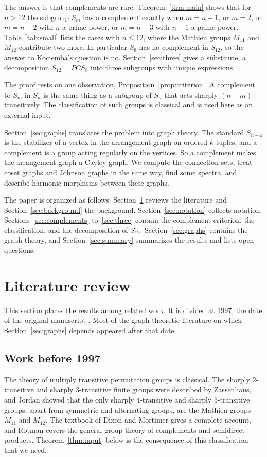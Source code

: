 \documentclass[12pt,letterpaper]{article}
\numberwithin{equation}{section}
\theoremstyle{definition}
\begin{document}
The answer is that complements are rare. Theorem~\ref{thm:main} shows that for $n>12$ the subgroup $S_m$ has a complement exactly when $m=n-1$, or $m=2$, or $m=n-2$ with $n$ a prime power, or $m=n-3$ with $n-1$ a prime power. Table~\ref{tab:small} lists the cases with $n\leq12$, where the Mathieu groups $M_{11}$ and $M_{12}$ contribute two more. In particular $S_8$ has no complement in $S_{12}$, so the answer to Kociemba's question is no. Section~\ref{sec:three} gives a substitute, a decomposition $S_{12}=PCS_8$ into three subgroups with unique expressions.

The proof rests on one observation, Proposition~\ref{prop:criterion}. A complement to $S_m$ in $S_n$ is the same thing as a subgroup of $S_n$ that acts sharply $(n-m)$-transitively. The classification of such groups is classical and is used here as an external input.

Section~\ref{sec:graphs} translates the problem into graph theory. The standard $S_{n-k}$ is the stabilizer of a vertex in the arrangement graph on ordered $k$-tuples, and a complement is a group acting regularly on the vertices. So a complement makes the arrangement graph a Cayley graph. We compute the connection sets, treat coset graphs and Johnson graphs in the same way, find some spectra, and describe harmonic morphisms between these graphs.

The paper is organized as follows. Section~\ref{sec:literature} reviews the literature and Section~\ref{sec:background} the background. Section~\ref{sec:notation} collects notation. Sections~\ref{sec:complements} to~\ref{sec:three} contain the complement criterion, the classification, and the decomposition of $S_{12}$. Section~\ref{sec:graphs} contains the graph theory, and Section~\ref{sec:summary} summarizes the results and lists open questions.

\section{Literature review}\label{sec:literature}
This section places the results among related work. It is divided at 1997, the date of the original manuscript \cite{Jo97}. Most of the graph-theoretic literature on which Section~\ref{sec:graphs} depends appeared after that date.

\subsection*{Work before 1997}
The theory of multiply transitive permutation groups is classical. The sharply $2$-transitive and sharply $3$-transitive finite groups were described by Zassenhaus, and Jordan showed that the only sharply $4$-transitive and sharply $5$-transitive groups, apart from symmetric and alternating groups, are the Mathieu groups $M_{11}$ and $M_{12}$. The textbook of Dixon and Mortimer \cite{DM96} gives a complete account, and Rotman \cite{Ro95} covers the general group theory of complements and semidirect products. Theorem~\ref{thm:input} below is the consequence of this classification that we need.
\end{document}
